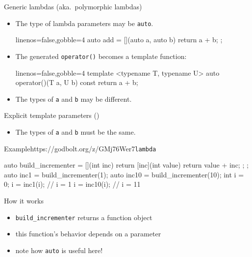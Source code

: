 \begin{advanced}
\begin{frame}[fragile]
  \begin{block}{Generic lambdas (aka.\ polymorphic lambdas)}
    \begin{itemize}
      \item The type of lambda parameters may be \texttt{auto}.
      \begin{cppcode*}{linenos=false,gobble=4}
        auto add = [](auto a, auto b) { return a + b; };
      \end{cppcode*}
      \item The generated \texttt{operator()} becomes a template function:
      \begin{cppcode*}{linenos=false,gobble=4}
        template <typename T, typename U>
        auto operator()(T a, U b) const { return a + b; }
      \end{cppcode*}
      \item The types of \texttt{a} and \texttt{b} may be different.
    \end{itemize}
  \end{block}
  \begin{block}{Explicit template parameters ()}
    \begin{itemize}
      \begin{cppcode*}{linenos=false,gobble=4}
        auto add = []<typename T>(T a, T b)
          { return a + b; };
      \end{cppcode*}
      \item The types of \texttt{a} and \texttt{b} must be the same.
    \end{itemize}
  \end{block}
\end{frame}

\begin{frame}[fragile]
  \begin{exampleblockGB}{Example}{https://godbolt.org/z/GMj76Wer7}{\texttt{lambda}}
    \begin{cppcode*}{}
      auto build_incrementer = [](int inc) {
        return [inc](int value) { return value + inc; };
      };
      auto inc1 = build_incrementer(1);
      auto inc10 = build_incrementer(10);
      int i = 0;
      i = inc1(i);   // i = 1
      i = inc10(i);  // i = 11
    \end{cppcode*}
  \end{exampleblockGB}
  \begin{block}{How it works}
    \begin{itemize}
      \item \texttt{build_incrementer} returns a function object
      \item this function's behavior depends on a parameter
      \item note how \texttt{auto} is useful here!
    \end{itemize}
  \end{block}
\end{frame}


\end{advanced}
